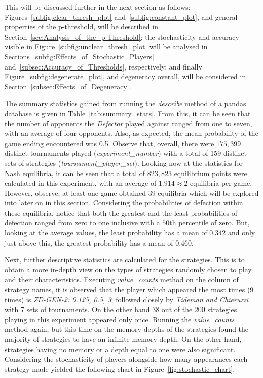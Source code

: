 This will be discussed further in the next section as follows:
Figures~\ref{subfig:clear_thresh_plot} and~\ref{subfig:constant_plot}, and
general properties of the p-threshold, will be described in
Section~\ref{sec:Analysis_of_the_p-Threshold}; the stochasticity and accuracy
visible in Figure~\ref{subfig:unclear_thresh_plot} will be analysed in
Sections~\ref{subfig:Effects_of_Stochastic_Players}
and~\ref{subsec:Accuracy_of_Thresholds}, respectively; and finally
Figure~\ref{subfig:degenerate_plot}, and degeneracy overall, will be considered
in Section~\ref{subsec:Effects_of_Degeneracy}.


The summary statistics gained from running the \textit{describe} method of a
pandas database is given in Table~\ref{tab:summary_stats}. From this, it can be
seen that the number of opponents the \textit{Defector} played against ranged
from one to seven, with an average of four opponents. Also, as expected, the
mean probability of the game ending encountered was 0.5. Observe that, overall,
there were \(175,399\) distinct tournaments played (\textit{experiment\_number}) with a total of 159 distinct sets of strategies (\textit{tournament\_player\_set}). 
Looking now at the statistics for Nash equilibria, it can be seen that a total
of \(823,823\) equilibrium points were calculated in this experiment, with an
average of \(1.914 \approx 2\) equilibria per game. However, observe, at least
one game obtained 39 equilibria which will be explored into later on in this
section. Considering the probabilities of defection within these equilibria,
notice that both the greatest and the least probabilities of defection ranged
from zero to one inclusive with a \(50\)th percentile of zero. But, looking at
the average values, the least probability has a mean of 0.342 and only just
above this, the greatest probability has a mean of 0.460.

Next, further descriptive statistics are calculated for the strategies. This is
to obtain a more in-depth view on the types of strategies randomly chosen to
play and their characteristics. Executing \textit{value\_counts} method on the
column of strategy names, it is observed that the player which appeared the most
times (9 times) is \textit{ZD-GEN-2: 0.125, 0.5, 3}; followed closely by
\textit{Tideman and Chieruzzi} with 7 sets of tournaments. On the other hand 38
out of the 200 strategies playing in this experiment appeared only once.
Running the \textit{value\_counts} method again, but this time on the memory
depths of the strategies found the majority of strategies to have an infinite
memory depth. On the other hand, strategies having no memory or a depth equal to
one were also significant. Considering the stochasticity of players alongside
how many appearances each strategy made yielded the following chart in
Figure~\ref{fig:stochastic_chart}.

